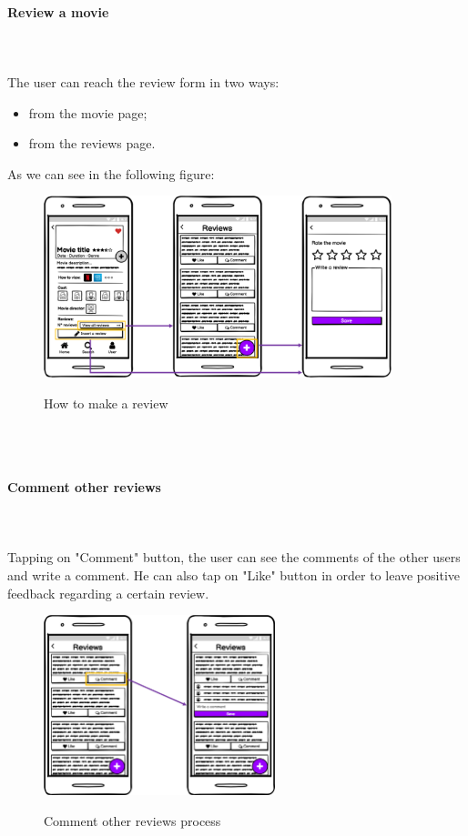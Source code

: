 \documentclass[12pt, a4paper]{article}
\numberwithin{figure}{section}
\begin{document}
\paragraph{Review a movie}
\mbox{}\\\\
The user can reach the review form in two ways:
\begin{itemize}
	\item from the movie page;
	\item from the reviews page.
\end{itemize}
As we can see in the following figure:
\begin{figure}[H]
	\centering
	\includegraphics[width=0.9\textwidth]{images/mockups/review.png}\\
	\caption{How to make a review}
\end{figure}
\mbox{}\\\\
\paragraph{Comment other reviews}
\mbox{}\\\\
Tapping on "Comment" button, the user can see the comments of the other users and write a comment.
He can also tap on "Like" button in order to leave positive feedback regarding a certain review.
\begin{figure}[H]
	\centering
	\includegraphics[width=0.6\textwidth]{images/mockups/comment.png}\\
	\caption{Comment other reviews process}
\end{figure}
\end{document}
